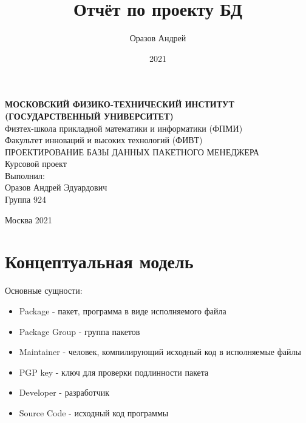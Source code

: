 \documentclass{article}
\author{Оразов Андрей}
\date{2021}
\title{Отчёт по проекту БД}
\begin{document}
\begin{center}
    \hfill \break
    \small{\textbf{МОСКОВСКИЙ ФИЗИКО-ТЕХНИЧЕСКИЙ ИНСТИТУТ \\(ГОСУДАРСТВЕННЫЙ УНИВЕРСИТЕТ)}}\\
    \hfill \break
    \normalsize{Физтех-школа прикладной математики и информатики (ФПМИ)}\\
    \normalsize{Факультет инноваций и высоких технологий (ФИВТ)}\\
    \hfill \break
    \hfill \break
    \hfill \break
    \hfill \break
    \large{ПРОЕКТИРОВАНИЕ БАЗЫ ДАННЫХ ПАКЕТНОГО МЕНЕДЖЕРА}\\
    \hfill \break
    \hfill \break
    \hfill \break
    \hfill \break
    \hfill \break
    \normalsize{Курсовой проект}\\
    \hfill \break
    \hfill \break
    \normalsize{Выполнил:}\\
    \normalsize{Оразов Андрей Эдуардович}\\
    \normalsize{Группа 924}\\
    \hfill \break
    \hfill \break
\end{center}
\vfill
\begin{center} Москва 2021 \end{center}


\thispagestyle{empty}
\newpage

\section{Концептуальная модель}

Основные сущности:

\begin{itemize}
    \item
        Package - пакет, программа в виде исполняемого файла

    \item
        Package Group - группа пакетов

    \item
        Maintainer - человек, компилирующий исходный код в исполняемые файлы

    \item
        PGP key - ключ для проверки подлинности пакета

    \item
        Developer - разработчик

    \item
        Source Code - исходный код программы


\end{itemize}
\end{document}
